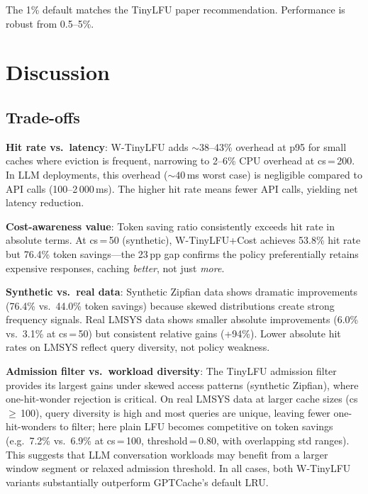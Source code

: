 \documentclass[11pt,a4paper]{article}
\begin{document}
The 1\% default matches the TinyLFU paper recommendation.
Performance is robust from 0.5--5\%.

\section{Discussion}

\subsection{Trade-offs}

\textbf{Hit rate vs.\ latency}: W-TinyLFU adds ${\sim}38$--43\% overhead at p95 for small caches where eviction is frequent, narrowing to 2--6\% CPU overhead at cs\,=\,200.
In LLM deployments, this overhead (${\sim}40$\,ms worst case) is negligible compared to API calls (100--2\,000\,ms).
The higher hit rate means fewer API calls, yielding net latency reduction.

\textbf{Cost-awareness value}: Token saving ratio consistently exceeds hit rate in absolute terms.
At cs\,=\,50 (synthetic), W-TinyLFU+Cost achieves 53.8\% hit rate but 76.4\% token savings---the 23\,pp gap confirms the policy preferentially retains expensive responses, caching \textit{better}, not just \textit{more}.

\textbf{Synthetic vs.\ real data}: Synthetic Zipfian data shows dramatic improvements (76.4\% vs.\ 44.0\% token savings) because skewed distributions create strong frequency signals.
Real LMSYS data shows smaller absolute improvements (6.0\% vs.\ 3.1\% at cs\,=\,50) but consistent relative gains (+94\%).
Lower absolute hit rates on LMSYS reflect query diversity, not policy weakness.

\textbf{Admission filter vs.\ workload diversity}: The TinyLFU admission filter provides its largest gains under skewed access patterns (synthetic Zipfian), where one-hit-wonder rejection is critical.
On real LMSYS data at larger cache sizes (cs\,$\geq$\,100), query diversity is high and most queries are unique, leaving fewer one-hit-wonders to filter; here plain LFU becomes competitive on token savings (e.g.\ 7.2\% vs.\ 6.9\% at cs\,=\,100, threshold\,=\,0.80, with overlapping std ranges).
This suggests that LLM conversation workloads may benefit from a larger window segment or relaxed admission threshold.
In all cases, both W-TinyLFU variants substantially outperform GPTCache's default LRU.
\end{document}
